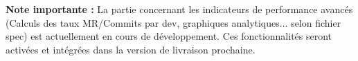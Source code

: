 \documentclass[12pt,a4paper]{article}
\begin{document}
\vspace{1cm}

\begin{tcolorbox}[colback=orange!10!white,colframe=orange!75!black,title=⚠️ TRAVAIL EN COURS : MOTEUR KPI]
\textbf{Note importante :} La partie concernant les indicateurs de performance avancés (Calculs des taux MR/Commits par dev, graphiques analytiques... selon fichier spec) est actuellement en cours de développement. Ces fonctionnalités seront activées et intégrées dans la version de livraison prochaine.
\end{tcolorbox}
\end{document}
